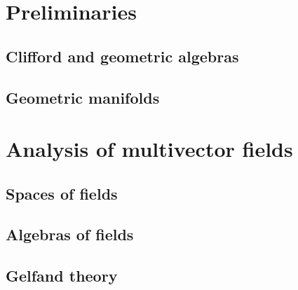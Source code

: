 \documentclass[doctor]{thesis}
\begin{document}

\chapter{Preliminaries}

\section{Clifford and geometric algebras}
\label{subsec:clifford_and_geometric_algebras}


\section{Geometric manifolds}
\label{sec:geometric_manifolds}




\chapter{Analysis of multivector fields}

\section{Spaces of fields}
\label{sec:spaces_of_fields}


\section{Algebras of fields}
\label{sec:algebras_of_fields}


\section{Gelfand theory}
\label{sec:gelfand_theory}

\end{document}
